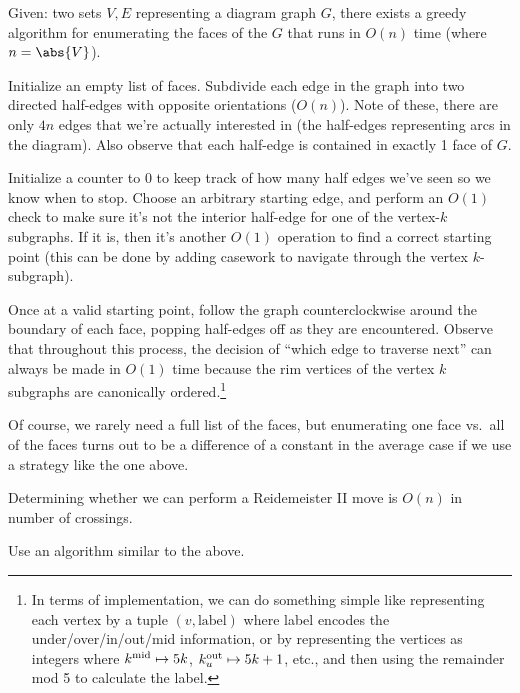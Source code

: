 \begin{proposition}
  Given: two sets $V, E$ representing a diagram graph $G$, there
  exists a greedy algorithm for enumerating the faces of the $G$ that
  runs in $O(n)$ time (where $n = \abs{V}$).
\end{proposition}
\begin{sproof}

  Initialize an empty list of faces. Subdivide each edge in the graph
  into two directed half-edges with opposite orientations ($O(n)$).
  Note of these, there are only $4n$ edges that we're actually
  interested in (the half-edges representing arcs in the diagram).
  Also observe that each half-edge is contained in exactly 1 face of
  $G$.

  Initialize a counter to $0$ to keep track of how many half edges
  we've seen so we know when to stop. Choose an arbitrary starting
  edge, and perform an $O(1)$ check to make sure it's not the interior
  half-edge for one of the vertex-$k$ subgraphs. If it is, then it's
  another $O(1)$ operation to find a correct starting point (this can
  be done by adding casework to navigate through the vertex
  $k$-subgraph).

  Once at a valid starting point, follow the graph counterclockwise
  around the boundary of each face, popping half-edges off as they are
  encountered. Observe that throughout this process, the decision of
  ``which edge to traverse next'' can always be made in $O(1)$ time
  because the rim vertices of the vertex $k$ subgraphs are canonically
  ordered.\footnote{In terms of implementation, we can do something
    simple like representing each vertex by a tuple $(v,
    \text{label})$ where label encodes the under/over/in/out/mid
    information, or by representing the vertices as integers where
    $k^{\rm mid} \mapsto 5k$, $k^{\rm out}_u \mapsto 5k+1$, etc., and
    then using the remainder mod 5 to calculate the label.}
\end{sproof}
Of course, we rarely need a full list of the faces, but enumerating
one face vs.\ all of the faces turns out to be a difference of a
constant in the average case if we use a strategy like the one above.
\begin{proposition}
  Determining whether we can perform a Reidemeister II move is $O(n)$
  in number of crossings.
\end{proposition}
\begin{sproof}
  Use an algorithm similar to the above.
\end{sproof}

